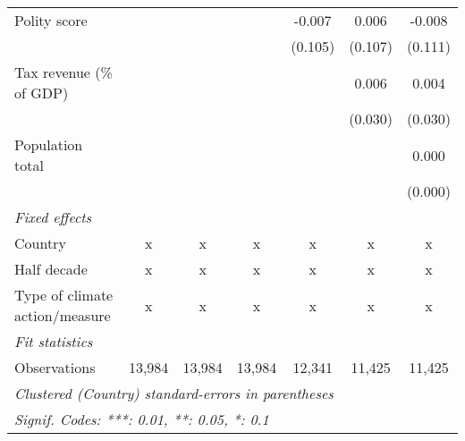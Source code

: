 \begin{tabular}{lcccccc}
   Polity score                                                      &              &             &              & -0.007       & 0.006        & -0.008\\   
                                                                     &              &             &              & (0.105)      & (0.107)      & (0.111)\\   
   Tax revenue (\% of GDP)                                           &              &             &              &              & 0.006        & 0.004\\   
                                                                     &              &             &              &              & (0.030)      & (0.030)\\   
   Population total                                                  &              &             &              &              &              & 0.000\\   
                                                                     &              &             &              &              &              & (0.000)\\   
   \emph{Fixed effects}\\
   Country                                                           & x            & x           & x            & x            & x            & x\\  
   Half decade                                                       & x            & x           & x            & x            & x            & x\\  
   Type of climate action/measure                                    & x            & x           & x            & x            & x            & x\\  
   \midrule \emph{Fit statistics}\\
   Observations                                                      & 13,984       & 13,984      & 13,984       & 12,341       & 11,425       & 11,425\\  
   \midrule
   \multicolumn{7}{l}{\emph{Clustered (Country) standard-errors in parentheses}}\\
   \multicolumn{7}{l}{\emph{Signif. Codes: ***: 0.01, **: 0.05, *: 0.1}}\\
\end{tabular}
\par\endgroup


